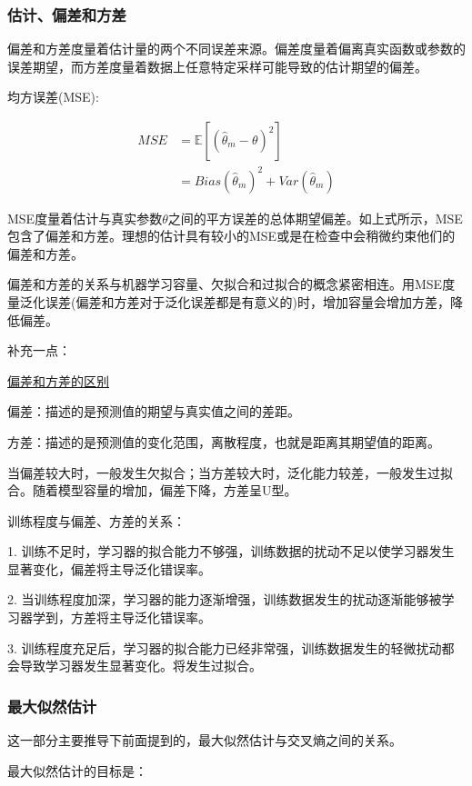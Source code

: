 \subsubsection{估计、偏差和方差}

偏差和方差度量着估计量的两个不同误差来源。偏差度量着偏离真实函数或参数的误差期望，而方差度量着数据上任意特定采样可能导致的估计期望的偏差。

均方误差(MSE):

\begin{align*}
MSE & = \mathbb{E} \left[ (\hat{\theta}_m - \theta)^2 \right] \\
   & = Bias(\hat{\theta}_m)^2 + Var(\hat{\theta}_m)
\end{align*}

MSE度量着估计与真实参数$\theta$之间的平方误差的总体期望偏差。如上式所示，MSE包含了偏差和方差。理想的估计具有较小的MSE或是在检查中会稍微约束他们的偏差和方差。

偏差和方差的关系与机器学习容量、欠拟合和过拟合的概念紧密相连。用MSE度量泛化误差(偏差和方差对于泛化误差都是有意义的)时，增加容量会增加方差，降低偏差。

补充一点：

\href{https://www.zhihu.com/question/20448464/answer/20039077}{偏差和方差的区别}

偏差：描述的是预测值的期望与真实值之间的差距。

方差：描述的是预测值的变化范围，离散程度，也就是距离其期望值的距离。

当偏差较大时，一般发生欠拟合；当方差较大时，泛化能力较差，一般发生过拟合。随着模型容量的增加，偏差下降，方差呈U型。

训练程度与偏差、方差的关系：

1. 训练不足时，学习器的拟合能力不够强，训练数据的扰动不足以使学习器发生显著变化，偏差将主导泛化错误率。

2. 当训练程度加深，学习器的能力逐渐增强，训练数据发生的扰动逐渐能够被学习器学到，方差将主导泛化错误率。

3. 训练程度充足后，学习器的拟合能力已经非常强，训练数据发生的轻微扰动都会导致学习器发生显著变化。将发生过拟合。

\subsubsection{最大似然估计}

这一部分主要推导下前面提到的，最大似然估计与交叉熵之间的关系。

最大似然估计的目标是：

